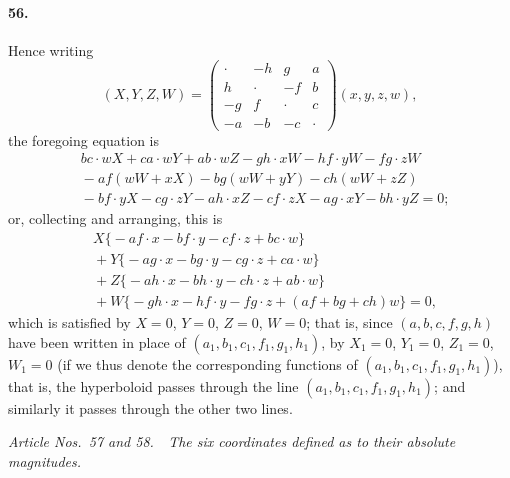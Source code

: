 \documentclass[11pt,a4paper]{article}
\begin{document}
\paragraph{56.}
Hence writing
\[
(X, Y, Z, W) =
\begin{pmatrix}
\cdot & -h & g & a \\
h & \cdot & -f & b \\
-g & f & \cdot & c \\
-a & -b & -c & \cdot
\end{pmatrix}
(x, y, z, w),
\]
the foregoing equation is
\begin{align*}
&bc\cdot wX + ca\cdot wY + ab\cdot wZ
 - gh\cdot xW - hf\cdot yW - fg\cdot zW \\
&{}- af(wW + xX) - bg(wW + yY) - ch(wW + zZ) \\
&{}- bf\cdot yX - cg\cdot zY - ah\cdot xZ
 - cf\cdot zX - ag\cdot xY - bh\cdot yZ = 0;
\end{align*}
or, collecting and arranging, this is
\begin{align*}
& X\bigl\{-af\cdot x - bf\cdot y - cf\cdot z + bc\cdot w\bigr\} \\
&{}+ Y\bigl\{-ag\cdot x - bg\cdot y - cg\cdot z + ca\cdot w\bigr\} \\
&{}+ Z\bigl\{-ah\cdot x - bh\cdot y - ch\cdot z + ab\cdot w\bigr\} \\
&{}+ W\bigl\{-gh\cdot x - hf\cdot y - fg\cdot z + (af + bg + ch)w\bigr\} = 0,
\end{align*}
which is satisfied by $X = 0$, $Y = 0$, $Z = 0$, $W = 0$; that is, since $(a,b,c,f,g,h)$
have been written in place of $(a_1, b_1, c_1, f_1, g_1, h_1)$, by $X_1 = 0$, $Y_1 = 0$, $Z_1 = 0$,
$W_1 = 0$ (if we thus denote the corresponding functions of $(a_1, b_1, c_1, f_1, g_1, h_1)$),
that is, the hyperboloid passes through the line $(a_1, b_1, c_1, f_1, g_1, h_1)$; and similarly
it passes through the other two lines.

\bigskip
\begin{center}
\textit{Article Nos.\ 57 and 58.\ \ The six coordinates defined as to their absolute magnitudes.}
\end{center}
\end{document}
